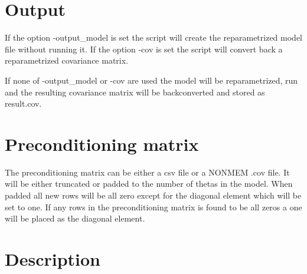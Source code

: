 \section{Output}

If the option -output\_model is set the script will create the reparametrized model file without running it.
If the option -cov is set the script will convert back a reparametrized covariance matrix.

If none of -output\_model or -cov are used the model will be reparametrized, run and the resulting covariance matrix will be
backconverted and stored as result.cov.


\section{Preconditioning matrix}

The preconditioning matrix can be either a csv file or a NONMEM .cov file. It will be either truncated or padded to the number of thetas in the model.
When padded all new rows will be all zero except for the diagonal element which will be set to one. If any rows in the preconditioning matrix is found
to be all zeros a one will be placed as the diagonal element.

\section{Description}






